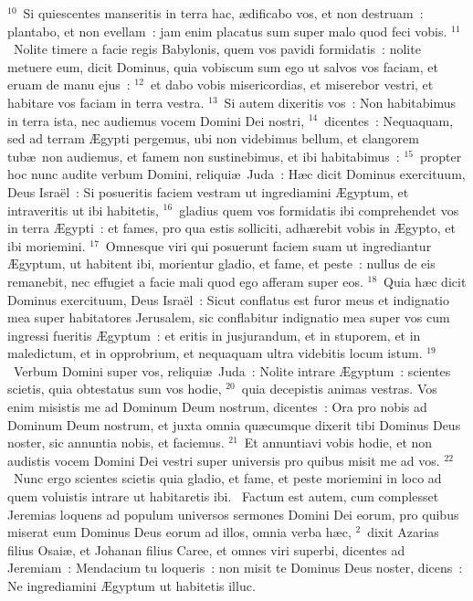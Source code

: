 ${}^{10}$~Si quiescentes manseritis in terra hac, \ae dificabo vos, et non destruam~: plantabo, et non evellam~: jam enim placatus sum super malo quod feci vobis.
${}^{11}$~Nolite timere a facie regis Babylonis, quem vos pavidi formidatis~: nolite metuere eum, dicit Dominus, quia vobiscum sum ego ut salvos vos faciam, et eruam de manu ejus~:
${}^{12}$~et dabo vobis misericordias, et miserebor vestri, et habitare vos faciam in terra vestra.
${}^{13}$~Si autem dixeritis vos~: Non habitabimus in terra ista, nec audiemus vocem Domini Dei nostri,
${}^{14}$~dicentes~: Nequaquam, sed ad terram \AE gypti pergemus, ubi non videbimus bellum, et clangorem tub\ae\ non audiemus, et famem non sustinebimus, et ibi habitabimus~:
${}^{15}$~propter hoc nunc audite verbum Domini, reliqui\ae\ Juda~: H\ae c dicit Dominus exercituum, Deus Isra\"el~: Si posueritis faciem vestram ut ingrediamini \AE gyptum, et intraveritis ut ibi habitetis,
${}^{16}$~gladius quem vos formidatis ibi comprehendet vos in terra \AE gypti~: et fames, pro qua estis solliciti, adh\ae rebit vobis in \AE gypto, et ibi moriemini.
${}^{17}$~Omnesque viri qui posuerunt faciem suam ut ingrediantur \AE gyptum, ut habitent ibi, morientur gladio, et fame, et peste~: nullus de eis remanebit, nec effugiet a facie mali quod ego afferam super eos.
${}^{18}$~Quia h\ae c dicit Dominus exercituum, Deus Isra\"el~: Sicut conflatus est furor meus et indignatio mea super habitatores Jerusalem, sic conflabitur indignatio mea super vos cum ingressi fueritis \AE gyptum~: et eritis in jusjurandum, et in stuporem, et in maledictum, et in opprobrium, et nequaquam ultra videbitis locum istum.
${}^{19}$~Verbum Domini super vos, reliqui\ae\ Juda~: Nolite intrare \AE gyptum~: scientes scietis, quia obtestatus sum vos hodie,
${}^{20}$~quia decepistis animas vestras. Vos enim misistis me ad Dominum Deum nostrum, dicentes~: Ora pro nobis ad Dominum Deum nostrum, et juxta omnia qu\ae cumque dixerit tibi Dominus Deus noster, sic annuntia nobis, et faciemus.
${}^{21}$~Et annuntiavi vobis hodie, et non audistis vocem Domini Dei vestri super universis pro quibus misit me ad vos.
${}^{22}$~Nunc ergo scientes scietis quia gladio, et fame, et peste moriemini in loco ad quem voluistis intrare ut habitaretis ibi.
~Factum est autem, cum complesset Jeremias loquens ad populum universos sermones Domini Dei eorum, pro quibus miserat eum Dominus Deus eorum ad illos, omnia verba h\ae c,
${}^{2}$~dixit Azarias filius Osai\ae , et Johanan filius Caree, et omnes viri superbi, dicentes ad Jeremiam~: Mendacium tu loqueris~: non misit te Dominus Deus noster, dicens~: Ne ingrediamini \AE gyptum ut habitetis illuc.
